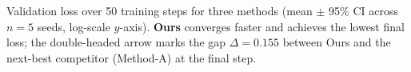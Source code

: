 \caption{Validation loss over 50 training steps for three methods (mean $\pm$ 95\% CI across $n{=}5$ seeds, log-scale $y$-axis). \textbf{Ours} converges faster and achieves the lowest final loss; the double-headed arrow marks the gap $\Delta{=}0.155$ between Ours and the next-best competitor (Method-A) at the final step.}
